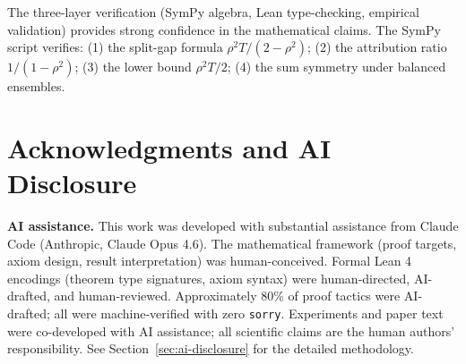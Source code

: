 \documentclass{article}
\begin{document}
The three-layer verification (SymPy algebra, Lean type-checking, empirical validation) provides strong confidence in the mathematical claims. The SymPy script verifies: (1) the split-gap formula $\rho^2 T/(2-\rho^2)$; (2) the attribution ratio $1/(1-\rho^2)$; (3) the lower bound $\rho^2 T/2$; (4) the sum symmetry under balanced ensembles.

\section*{Acknowledgments and AI Disclosure}
\textbf{AI assistance.} This work was developed with substantial assistance from Claude Code (Anthropic, Claude Opus 4.6). The mathematical framework (proof targets, axiom design, result interpretation) was human-conceived. Formal Lean 4 encodings (theorem type signatures, axiom syntax) were human-directed, AI-drafted, and human-reviewed. Approximately 80\% of proof tactics were AI-drafted; all were machine-verified with zero \texttt{sorry}. Experiments and paper text were co-developed with AI assistance; all scientific claims are the human authors' responsibility. See Section~\ref{sec:ai-disclosure} for the detailed methodology.



\end{document}
